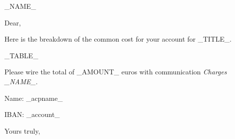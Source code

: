 \documentclass[12pt]{lettre}
\begin{document}
\begin{letter}{_NAME_}
\signature{_signature_}
\address{_address_}
\nofax

\def\concname{Objet :~} %
\opening{Dear,}

Here is the breakdown of the common cost for your account for _TITLE_.

_TABLE_

Please wire the total of _AMOUNT_ euros with communication \textit{Charges _NAME_}.

Name: _acpname_

IBAN: _account_

\closing{Yours truly,}

\end{letter}
\end{document}
